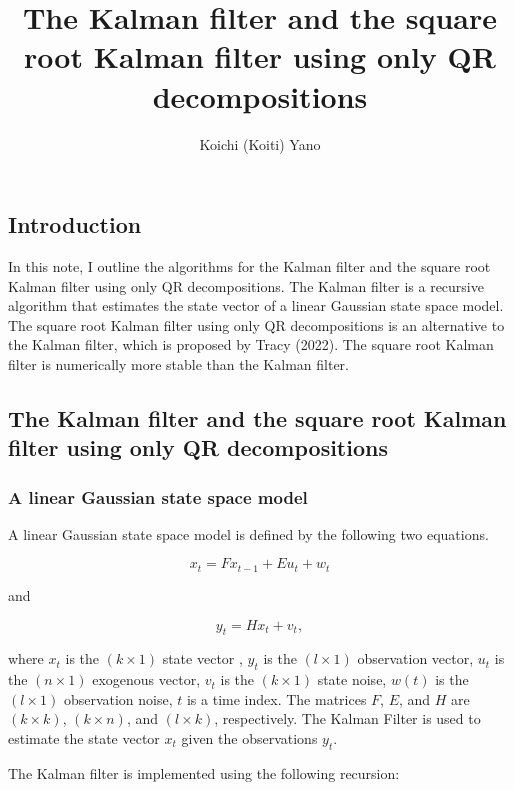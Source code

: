 \documentclass[
  letterpaper,
  DIV=11,
  numbers=noendperiod]{scrartcl}
\title{The Kalman filter and the square root Kalman filter using only QR
decompositions}
\author{Koichi (Koiti) Yano}
\date{}
\begin{document}
\maketitle

\subsection{Introduction}\label{introduction}

In this note, I outline the algorithms for the Kalman filter and the
square root Kalman filter using only QR decompositions. The Kalman
filter is a recursive algorithm that estimates the state vector of a
linear Gaussian state space model. The square root Kalman filter using
only QR decompositions is an alternative to the Kalman filter, which is
proposed by Tracy (2022). The square root Kalman filter is numerically
more stable than the Kalman filter.

\subsection{The Kalman filter and the square root Kalman filter using
only QR
decompositions}\label{the-kalman-filter-and-the-square-root-kalman-filter-using-only-qr-decompositions}

\subsubsection{A linear Gaussian state space
model}\label{a-linear-gaussian-state-space-model}

A linear Gaussian state space model is defined by the following two
equations.

\[
x_t=Fx_{t-1} + E u_t + w_t
\]

and

\[y_t=Hx_t+v_t,\]

where \(x_t\) is the \((k \times 1)\) state vector , \(y_t\) is the
\((l \times 1)\) observation vector, \(u_t\) is the \((n \times 1)\)
exogenous vector, \(v_t\) is the \((k \times 1)\) state noise, \(w(t)\)
is the \((l \times 1)\) observation noise, \(t\) is a time index. The
matrices \(F\), \(E\), and \(H\) are \((k \times k)\), \((k \times n)\),
and \((l \times k)\), respectively. The Kalman Filter is used to
estimate the state vector \(x_t\) given the observations \(y_t\).

The Kalman filter is implemented using the following recursion:
\end{document}
